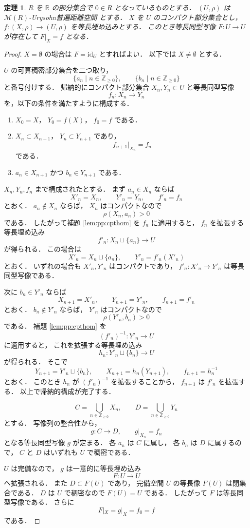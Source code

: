 \documentclass[leqno, 12pt]{jsarticle}
\newtheorem{thm}{定理}[section]
\newcommand{\zz}{\mathbb{Z}}
\newcommand{\yozz}[1]{\zz_{\ge #1}}
\newcommand{\rr}{\mathbb{R}}
\newcommand{\SetPointDist}[3]{#1(#2,#3)}
\newcommand{\Met}[1]{\mathscr{M}(#1)}
\newcommand{\restr}[2]{#1|_{#2}}
\begin{document}
\begin{thm}\label{thm:pp:cptext}
$R$
を
$\rr$
の部分集合で
$0\in R$
となっているものとする．
$(U, \rho)$
は
$\Met{R}$-Urysohn普遍距離空間
とする．
$X$
を
$U$
のコンパクト部分集合とし，
$f\colon  (X, \rho)\to (U, \rho)$
を等長埋め込みとする．
このとき等長同型写像
$F\colon  U\to U$
が存在して
$\restr{F}{X}=f$
となる．
\end{thm}
\begin{proof}
$X=\emptyset$
の場合は
$F=\mathrm{id}_U$
とすればよい．
以下では
$X\neq\emptyset$
とする．

$U$
の可算稠密部分集合を二つ取り，
\[
\{a_n\mid n\in\yozz{0}\},
\qquad
\{b_n\mid n\in\yozz{0}\}
\]
と番号付けする．
帰納的にコンパクト部分集合
$X_n,Y_n\subset U$
と等長同型写像
\[
f_n\colon X_n\longrightarrow Y_n
\]
を，以下の条件を満たすように構成する．
\begin{enumerate}[label=\textup{(\arabic*)}]
\item
$X_0=X$，
$Y_0=f(X)$，
$f_0=f$
である．
\item
$X_n\subset X_{n+1}$，
$Y_n\subset Y_{n+1}$
であり，
\[
\restr{f_{n+1}}{X_n}=f_n
\]
である．
\item
$a_n\in X_{n+1}$
かつ
$b_n\in Y_{n+1}$
である．
\end{enumerate}

$X_n,Y_n,f_n$
まで構成されたとする．
まず
$a_n\in X_n$
ならば
\[
X'_n=X_n,\qquad
Y'_n=Y_n,\qquad
f'_n=f_n
\]
とおく．
$a_n\notin X_n$
ならば，
$X_n$
はコンパクトなので
\[
\SetPointDist{\rho}{X_n}{a_n}>0
\]
である．
したがって補題
\ref{lem:pp:cpthom}
を
$f_n$
に適用すると，
$f_n$
を拡張する等長埋め込み
\[
f'_n\colon X_n\sqcup\{a_n\}\longrightarrow U
\]
が得られる．
この場合は
\[
X'_n=X_n\sqcup\{a_n\},
\qquad
Y'_n=f'_n(X'_n)
\]
とおく．
いずれの場合も
$X'_n,Y'_n$
はコンパクトであり，
$f'_n\colon X'_n\to Y'_n$
は等長同型写像である．

次に
$b_n\in Y'_n$
ならば
\[
X_{n+1}=X'_n,\qquad
Y_{n+1}=Y'_n,\qquad
f_{n+1}=f'_n
\]
とおく．
$b_n\notin Y'_n$
ならば，
$Y'_n$
はコンパクトなので
\[
\SetPointDist{\rho}{Y'_n}{b_n}>0
\]
である．
補題
\ref{lem:pp:cpthom}
を
\[
(f'_n)^{-1}\colon Y'_n\longrightarrow U
\]
に適用すると，
これを拡張する等長埋め込み
\[
h_n\colon Y'_n\sqcup\{b_n\}\longrightarrow U
\]
が得られる．
そこで
\[
Y_{n+1}=Y'_n\sqcup\{b_n\},
\qquad
X_{n+1}=h_n(Y_{n+1}),
\qquad
f_{n+1}=h_n^{-1}
\]
とおく．
このとき
$h_n$
が
$(f'_n)^{-1}$
を拡張することから，
$f_{n+1}$
は
$f'_n$
を拡張する．
以上で帰納的構成が完了する．

\[
C=\bigcup_{n\in\yozz{0}}X_n,
\qquad
D=\bigcup_{n\in\yozz{0}}Y_n
\]
とする．
写像列の整合性から，
\[
g\colon C\longrightarrow D,
\qquad
\restr{g}{X_n}=f_n
\]
となる等長同型写像
$g$
が定まる．
各
$a_n$
は
$C$
に属し，
各
$b_n$
は
$D$
に属するので，
$C$
と
$D$
はいずれも
$U$
で稠密である．

$U$
は完備なので，
$g$
は一意的に等長埋め込み
\[
F\colon U\longrightarrow U
\]
へ拡張される．
また
$D\subset F(U)$
であり，
完備空間
$U$
の等長像
$F(U)$
は閉集合である．
$D$
は
$U$
で稠密なので
$F(U)=U$
である．
したがって
$F$
は等長同型写像である．
さらに
\[
\restr{F}{X}
=\restr{g}{X}
=f_0
=f
\]
である．
\end{proof}
\end{document}
